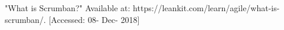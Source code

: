  "What is Scrumban?" Available at: https://leankit.com/learn/agile/what-is-scrumban/. [Accessed: 08- Dec- 2018]
